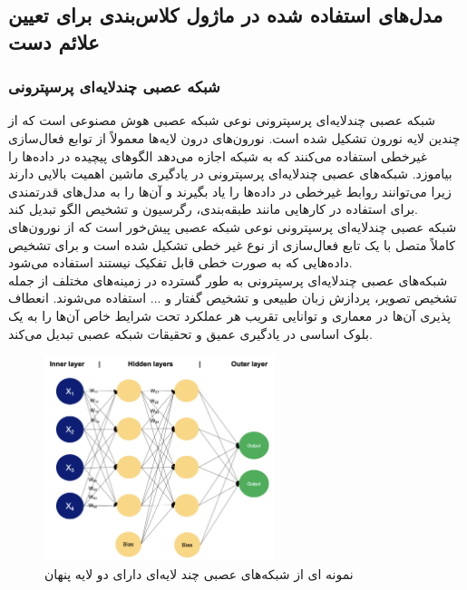 \subsection{مدل‌های استفاده شده در ماژول کلاس‌بندی برای تعیین علائم دست}

\subsubsection{شبکه عصبی  چندلایه‌ای پرسپترونی}
شبکه عصبی  چندلایه‌ای پرسپترونی  نوعی شبکه عصبی  هوش مصنوعی است که از چندین لایه نورون تشکیل شده است. نورون‌های درون لایه‌ها معمولاً از
توابع فعال‌سازی غیرخطی  استفاده می‌کنند که به شبکه اجازه می‌دهد الگوهای پیچیده در داده‌ها را بیاموزد. شبکه‌های عصبی چندلایه‌ای پرسپترونی در 
یادگیری ماشین اهمیت بالایی دارند زیرا می‌توانند روابط غیرخطی در داده‌ها را یاد بگیرند و آن‌ها را به مدل‌های قدرتمندی برای استفاده در کارهایی مانند طبقه‌بندی، رگرسیون و تشخیص الگو تبدیل کند. 
\\
شبکه عصبی چندلایه‌ای پرسپترونی نوعی شبکه عصبی پیش‌خور است که از نورون‌های کاملاً متصل با یک تابع فعال‌سازی از نوع غیر خطی تشکیل شده است و  برای تشخیص داده‌هایی که به صورت خطی قابل تفکیک نیستند استفاده می‌شود.
\\
شبکه‌های عصبی چندلایه‌ای پرسپترونی به طور گسترده در زمینه‌های مختلف از جمله تشخیص تصویر، پردازش زبان طبیعی و تشخیص گفتار و ... استفاده می‌شوند. انعطاف پذیری آن‌ها در
معماری و توانایی تقریب هر عملکرد تحت شرایط خاص آن‌ها را به یک بلوک اساسی در یادگیری عمیق و تحقیقات شبکه عصبی تبدیل می‌کند. 

\begin{figure}[h]
    \centering
    \includegraphics[width=0.6\textwidth]{MLP.png}
    \caption[نمونه ای از شبکه‌های عصبی چند لایه‌ای دارای دو لایه پنهان]{نمونه ای از شبکه‌های عصبی چند لایه‌ای دارای دو لایه پنهان\cite{Multilay58:online}}
\end{figure}


